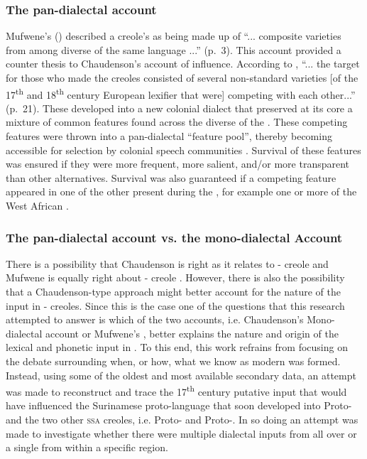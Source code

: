 \subsubsection {The pan-dialectal account}\label{2.2.4.2}
Mufwene's (\citeyear{Mufwene01})  described a creole's  as being made up of ``... composite varieties from among diverse  of the same language ...'' (p.~3). This account provided a counter thesis to Chaudenson's account of  influence. According to \citet{Mufwene08}, ``... the target for those who made the creoles consisted of several non-standard varieties [of the 17\textsuperscript{th} and 18\textsuperscript{th} century European lexifier  that were] competing with each other...'' (p.~21). These  developed into a new colonial dialect that preserved at its core a mixture of common features found across the diverse  of the . These competing features were thrown into a pan-dialectal ``feature pool'', thereby becoming accessible for selection by colonial speech communities \citep{Mufwene08, Mufwene01}. Survival of these features was ensured if they were more frequent, more salient, and/or more transparent than other alternatives. Survival was also guaranteed if a competing feature appeared in one of the other  present during the , for example one or more of the West African  \citep{Mufwene01}.

\subsubsection {The {pan-dialectal account} vs. the mono-dialectal Account}\label{2.2.4.3}
There is a possibility that Chaudenson is right as it relates to - creole  and Mufwene is equally right about - creole . However, there is also the possibility that a Chaudenson-type approach might better account for the nature of the  input in - creoles. Since this is the case one of the questions that this research attempted to answer is which of the two accounts, i.e. Chaudenson's Mono-dialectal account or Mufwene's , better explains the nature and origin of the lexical and phonetic input in . To this end, this work refrains from focusing on the debate surrounding when, or how, what we know as modern  was formed. Instead, using some of the oldest and most available secondary  data, an attempt was made to reconstruct and trace the 17\textsuperscript{th} century putative  input that would have influenced the Surinamese proto-language that soon developed into Proto- and the two other \textsc{ssa} creoles, i.e. Proto- and Proto-. In so doing an attempt was made to investigate whether there were multiple dialectal inputs from all over  or a single  from within a specific region.

